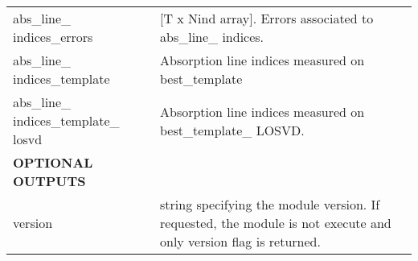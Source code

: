 \begin{center}
\begin{longtable}{p{2.7cm}| p{11.1cm}}
%
abs\_line\_ indices\_errors & [T x Nind array]. Errors associated to abs\_line\_ indices. \\
%
abs\_line\_ indices\_template &  Absorption line indices measured on best\_template \\
%
abs\_line\_ indices\_template\_ losvd &   Absorption line indices measured on best\_template\_ LOSVD.\\
\hline
{\bf  OPTIONAL OUTPUTS} &  \\
\hline
version & string specifying the module version. If requested, the module is not execute and only version flag is returned.\\
\hline
\hline
\end{longtable}
\end{center}




